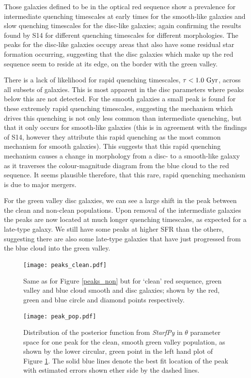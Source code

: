 \documentclass{mn2e}
\begin{document}

Those galaxies defined to be in the optical red sequence show a prevalence for intermediate quenching timescales at early times for the smooth-like galaxies and slow quenching timescales for the disc-like galaxies; again confirming the results found by S14 for different quenching timescales for different morphologies. The peaks for the disc-like galaxies occupy areas that also have some residual star formation occurring, suggesting that the disc galaxies which make up the red sequence seem to reside at its edge, on the border with the green valley. 

There is a lack of likelihood for rapid quenching timescales, $\tau < 1.0~\rm{Gyr}$, across all subsets of galaxies. This is most apparent in the disc parameters %
where peaks below this are not detected. For the smooth galaxies a small peak is found for these extremely rapid quenching timescales, suggesting the mechanism which drives this quenching is not only less common than intermediate quenching, but that it only occurs for smooth-like galaxies (this is in agreement with the findings of S14, however they attribute this rapid quenching as the most common mechanism for smooth galaxies). This suggests that this rapid quenching mechanism causes a change in morphology from a disc- to a smooth-like galaxy as it traverses the colour-magnitude diagram from the blue cloud to the red sequence. It seems plausible therefore, that this rare, rapid quenching mechanism is due to major mergers.

For the green valley disc galaxies, we can see a large shift in the peak between the clean and non-clean populations. Upon removal of the intermediate galaxies the peaks are now located at much longer quenching timescales, as expected for a late-type galaxy.  We still have some peaks at higher SFR than the others, suggesting there are also some late-type galaxies that have just progressed from the blue cloud into the green valley. 

\begin{figure}
\texttt{[image: peaks\_clean.pdf]}
\caption{Same as for Figure \ref{peaks_non} but for `clean' red sequence, green valley and blue cloud smooth and disc galaxies; shown by the red, green and blue circle and diamond points respectively.}
\label{peaks_clean}
\end{figure}

\begin{figure}
\texttt{[image: peak\_pop.pdf]}
\caption{Distribution of the posterior function from \emph{StarfPy} in $\theta$ parameter space for one peak for the clean, smooth green valley population, as shown by the lower circular, green point in the left hand plot of Figure \ref{peaks_clean}. The solid blue lines denote the best fit location of the peak with estimated errors shown ether side by the dashed lines.}
\label{peak_pop}
\end{figure}
\end{document}
